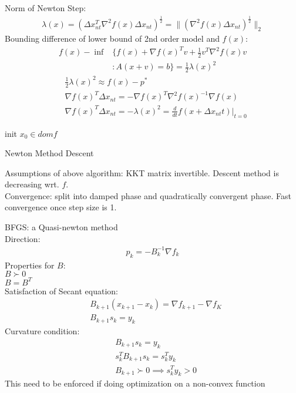 \documentclass[8pt]{report}
\newcommand{\norm}[1]{\|#1\|}
\begin{document}
\begin{multicols*}{2}
  Norm of Newton Step:
  \begin{align*}
    \lambda(x) = (\Delta x_{nt}^T \nabla^2 f(x) \Delta x_{nt})^{\frac{1}{2}} = \norm{(\nabla^2 f(x) \Delta x_{nt})^{\frac{1}{2}}}_2
  \end{align*}
  Bounding difference of lower bound of 2nd order model and $f(x)$:
  \begin{align*}
    f(x) - \inf & \{ f(x) + \nabla f(x)^T v + \frac{1}{2} v^T \nabla^2 f(x) v\\
                &: A(x+v) = b \} = \frac{1}{2} \lambda(x)^2
  \end{align*}
  \begin{align*}
    &\frac{1}{2}\lambda(x)^2 \approx f(x) -p^*\\
    &\nabla f(x)^T \Delta x_{nt} = - \nabla f(x)^T \nabla^2 f(x)^{-1} \nabla f(x)\\
    &\nabla f(x)^T \Delta x_{nt} = -\lambda(x)^2 = \frac{d}{dt}f(x+\Delta x_{nt}t)|_{t=0}
  \end{align*}
  
  \begin{algorithm}[H]
    init $x_0 \in dom f$\;
    \caption{Newton Method Descent\label{NewtonMethod}}
  \end{algorithm}
  Assumptions of above algorithm: KKT matrix invertible. Descent method is decreasing wrt. $f$.\\
  
  Convergence: split into damped phase and quadratically convergent phase. Fast convergence once step size is 1.

  \vfill\null
  \columnbreak

  BFGS: a Quasi-newton method\\
  Direction:
  \begin{align*}
    p_k = -B_k^{-1} \nabla f_k
  \end{align*}
  Properties for $B$:\\
  $B \succ 0$\\
  $B=B^T$\\
  Satisfaction of Secant equation:
  \begin{align*}
    &B_{k+1} (x_{k+1}-x_k) = \nabla f_{k+1} - \nabla f_K\\
    &B_{k+1} s_k = y_k
  \end{align*}
  Curvature condition:
  \begin{align*}
    &B_{k+1} s_k = y_k\\
    &s_k^T B_{k+1} s_k = s_k^T y_k\\
    &B_{k+1} \succ 0 \implies s_k^T y_k > 0
  \end{align*}
  This need to be enforced if doing optimization on a non-convex function\\


\end{multicols*}
\end{document}
